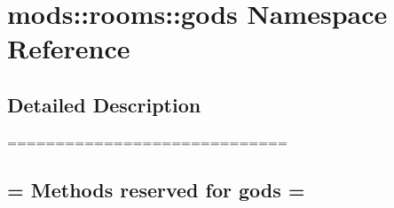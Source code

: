 \hypertarget{namespacemods_1_1rooms_1_1gods}{}\section{mods\+:\+:rooms\+:\+:gods Namespace Reference}
\label{namespacemods_1_1rooms_1_1gods}


\subsection{Detailed Description}
============================= \subsection*{= Methods reserved for gods = }